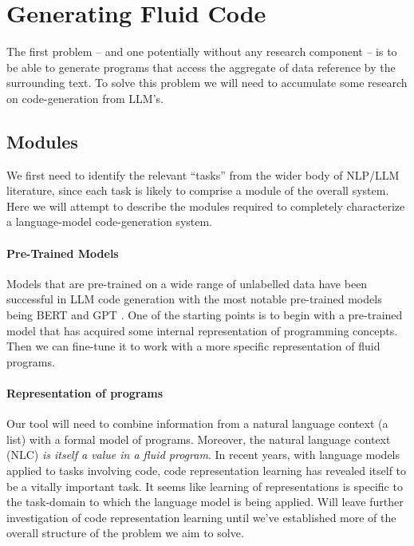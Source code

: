 \section{Generating Fluid Code}
\label{sec:generate-fluid}

The first problem -- and one potentially without any research component -- is to be able
to generate  programs that access the aggregate of data reference by the surrounding text.
To solve this problem we will need to accumulate some research on code-generation from LLM's.

\subsection{Modules}
We first need to identify the relevant ``tasks'' from the wider body of NLP/LLM literature,
since each task is likely to comprise a module of the overall system. Here we will attempt
to describe the modules required to completely characterize a language-model code-generation
system.

\paragraph*{Pre-Trained Models}
Models that are pre-trained on a wide range of unlabelled data have been successful in LLM
code generation with the most notable pre-trained models being BERT \citep{devlin2019}
and GPT \citep{radford2018}. One of the starting points is to begin with a pre-trained model
that has acquired some internal representation of programming concepts. Then we can fine-tune
it to work with a more specific representation of fluid programs.

\paragraph*{Representation of  programs}
Our tool will need to combine information from a natural language context (a  list)
with a formal model of  programs. Moreover, the natural language context (NLC)
\textit{is itself a value in a fluid program}. In recent years, with language models applied to tasks
involving code, code representation learning has revealed itself to be a vitally important task.
It seems like learning of representations is specific to the task-domain to which the language model
is being applied. Will leave further investigation of code representation learning until we've 
established more of the overall structure of the problem we aim to solve.

